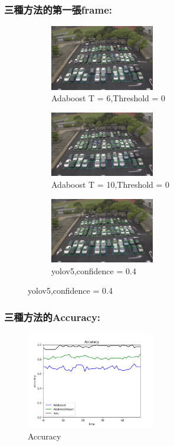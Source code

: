 \documentclass[12,a4paper]{article}
\begin{document}
\subsubsection{三種方法的第一張frame:}
\begin{figure}[!ht]
\centering
    \begin{subfigure}
    \centering
    \caption{Adaboost T = 6,Threshold = 0}
    \includegraphics[width=0.5\textwidth]{pic/detectpicorigin/adaboostpic0.png}
    \end{subfigure}
    \begin{subfigure}
    \centering
    \caption{Adaboost T = 10,Threshold = 0}
    \includegraphics[width=0.5\textwidth]{pic/detectpicm/adaboostpic_m0.png}
    \end{subfigure}
    \begin{subfigure}
    \centering
    \caption{yolov5,confidence = 0.4}
    \includegraphics[width=0.5\textwidth]{pic/Yolov5_first_frame.png}
    \end{subfigure}
\end{figure}
\FloatBarrier
\subsubsection{三種方法的Accuracy:}
\begin{figure}[!ht]
    \centering
    \caption{Accuracy}
    \includegraphics[width=0.5\textwidth]{pic/Accuracy.png}
\end{figure}
\FloatBarrier
\end{document}
